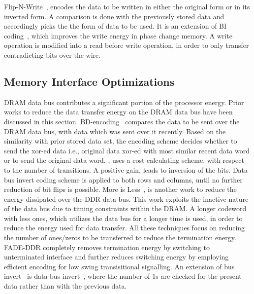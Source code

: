 Flip-N-Write~\cite{flipnwrite}, encodes the data to be written in either the original form or in its inverted form. A comparison is done with the previously stored data and accordingly picks the the form of data to be used. It is an extension of BI coding~\cite{bus-invert}, which improves the write energy in phase change memory. A write operation is modified into a read before write operation, in order to only transfer contradicting bits over the wire. 

    
\subsection{Memory Interface Optimizations}
DRAM data bus contributes a significant portion of the processor energy. Prior works to reduce the data transfer energy on the DRAM data bus have been discussed in this section. BD-encoding~\cite{bdencoding} compares the data to be sent over the DRAM data bus, with data which was sent over it recently. Based on the similarity with prior stored data set, the encoding scheme decides whether to send the xor-ed data i.e., original data xor-ed with most similar recent data word or to send the original data word. \cite{CAFO}, uses a cost calculating scheme, with respect to the number of transitions. A positive gain, leads to inversion of the bits. Data bus invert coding scheme is applied to both rows and columns, until no further reduction of bit flips is possible. More is Less~\cite{moreisless}, is another work to reduce the energy dissipated over the DDR data bus. This work exploits the inactive nature of the data bus due to timing constraints within the DRAM. A longer codeword with less ones, which utilizes the data bus for a longer time is used, in order to reduce the energy used for data transfer. All these techniques focus on reducing the number of ones/zeros to be transferred to reduce the termination energy. FADE-DDR completely removes termination energy by switching to unterminated interface and further reduces switching energy by employing efficient encoding for low swing transisitional signalling. An extension of bus invert~\cite{bus-invert}  is data bus invert~\cite{dbi}, where the number of 1s are checked for the present data rather than with the previous data.     



